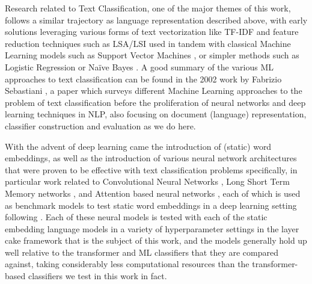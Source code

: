 \documentclass[final]{clv2025}
\begin{document}
Research related to Text Classification, one of the major themes of this work, follows a similar trajectory as language representation described above, with early solutions leveraging various forms of text vectorization like TF-IDF \cite{sparckjones1972statistical} and feature reduction techniques such as LSA/LSI \cite{deerwester} used in tandem with classical Machine Learning models such as Support Vector Machines \cite{joachims1998text}, or simpler methods such as Logistic Regression or Naïve Bayes \cite{mccallum1998comparison}. A good summary of the various ML approaches to text classification can be found in the 2002 work by Fabrizio Sebastiani \cite{sebastiani2002machine}, a paper which surveys different Machine Learning approaches to the problem of text classification before the proliferation of neural networks and deep learning techniques in NLP, also focusing on document (language) representation, classifier construction and evaluation as we do here.

With the advent of deep learning came the introduction of (static) word embeddings, as well as the introduction of various neural network architectures that were proven to be effective with text classification problems specifically, in particular work related to Convolutional Neural Networks \cite{yoon2014convolutional} \cite{zhang2015character}, Long Short Term Memory networks \cite{zang2021research}, and Attention based neural networks \cite{liuguo2019bidirectional}, each of which is used as benchmark models to test static word embeddings in a deep learning setting following \cite{moreo}. Each of these neural models is tested with each of the static embedding language models in a variety of hyperparameter settings in the layer cake framework that is the subject of this work, and the models generally hold up well relative to the transformer and ML classifiers that they are compared against, taking considerably less computational resources than the transformer-based classifiers we test in this work in fact.
\end{document}
